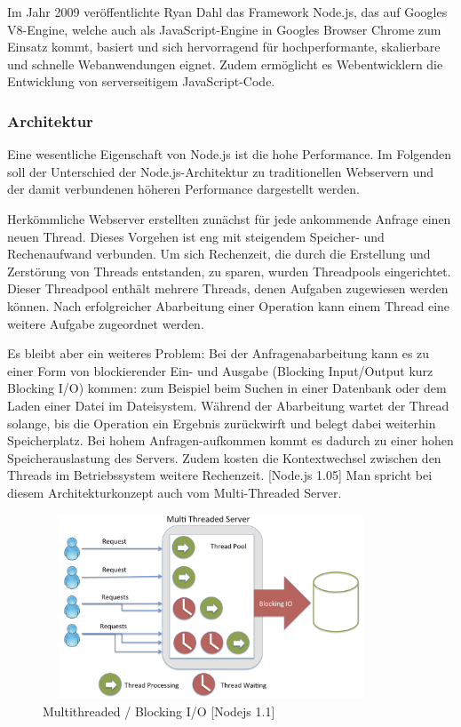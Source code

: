 Im Jahr 2009 veröffentlichte Ryan Dahl das Framework Node.js, das auf Googles V8-Engine, welche auch als JavaScript-Engine in Googles Browser Chrome zum Einsatz kommt, basiert und sich hervorragend für hochperformante, skalierbare und schnelle Webanwendungen eignet. Zudem ermöglicht es Webentwicklern die Entwicklung von serverseitigem JavaScript-Code. \-[NodeJS 1.0]


\subsubsection{Architektur}
Eine wesentliche Eigenschaft von Node.js ist die hohe Performance. Im Folgenden soll der Unterschied der Node.js-Architektur zu traditionellen Webservern und der damit verbundenen höheren Performance dargestellt werden.
\newline

Herkömmliche Webserver erstellten zunächst für jede ankommende Anfrage einen neuen Thread. Dieses Vorgehen ist eng mit steigendem Speicher- und Rechenaufwand verbunden. Um sich Rechenzeit, die durch die Erstellung und Zerstörung von Threads entstanden, zu sparen, wurden Threadpools eingerichtet. Dieser Threadpool enthält mehrere Threads, denen Aufgaben zugewiesen werden können. Nach erfolgreicher Abarbeitung einer Operation kann einem Thread eine weitere Aufgabe zugeordnet werden.
\newline

Es bleibt aber ein weiteres Problem: Bei der Anfragenabarbeitung kann es zu einer Form von blockierender Ein- und Ausgabe (Blocking Input/Output kurz Blocking I/O) kommen: zum Beispiel beim Suchen in einer Datenbank oder dem Laden einer Datei im Dateisystem. Während der Abarbeitung wartet der Thread solange, bis die Operation ein Ergebnis zurückwirft und belegt dabei weiterhin Speicherplatz. Bei hohem Anfragen-aufkommen kommt es dadurch zu einer hohen Speicherauslastung des Servers. Zudem kosten die Kontextwechsel zwischen den Threads im Betriebssystem weitere Rechenzeit. [Node.js 1.05] Man spricht bei diesem Architekturkonzept auch vom Multi-Threaded Server.
\newline

\begin{figure}[h]
\centering
\includegraphics[width=10cm, height = 5.5cm]{images/nodejs_otherthreading.png}
\caption{Multithreaded / Blocking I/O [Nodejs 1.1]}
\end{figure}
 
